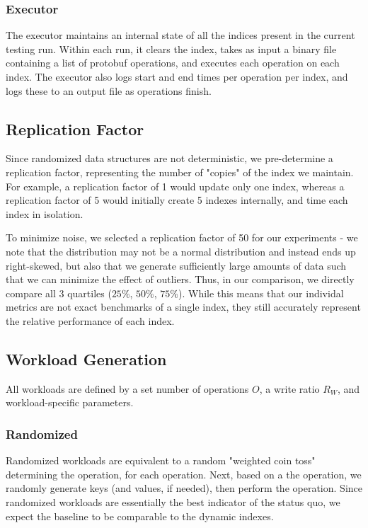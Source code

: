 \documentclass[sigconf]{acmart}
\begin{document}
\subsubsection{Executor}
The executor maintains an internal state of all the indices present in the current testing run. Within each run, it clears the index, takes as input a binary file containing a list of protobuf operations, and executes each operation on each index. The executor also logs start and end times per operation per index, and logs these to an output file as operations finish. 

\subsection{Replication Factor}
Since randomized data structures are not deterministic, we pre-determine a replication factor, representing the number of "copies" of the index we maintain. For example, a replication factor of 1 would update only one index, whereas a replication factor of 5 would initially create 5 indexes internally, and time each index in isolation.

To minimize noise, we selected a replication factor of 50 for our experiments - we note that the distribution may not be a normal distribution \cite{probdist} and instead ends up right-skewed, but also that we generate sufficiently large amounts of data such that we can minimize the effect of outliers. Thus, in our comparison, we directly compare all 3 quartiles ($25\%$, $50\%$, $75\%$). While this means that our individal metrics are not exact benchmarks of a single index, they still accurately represent the relative performance of each index.

\subsection {Workload Generation}
\label{workloads}
All workloads are defined by a set number of operations $O$, a write ratio $R_W$, and workload-specific parameters.

\subsubsection{Randomized}
Randomized workloads are equivalent to a random "weighted coin toss" determining the operation, for each operation. Next, based on a the operation, we randomly generate keys (and values, if needed), then perform the operation. Since randomized workloads are essentially the best indicator of the status quo, we expect the baseline to be comparable to the dynamic indexes.
\end{document}
